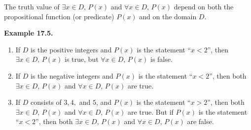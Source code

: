 \documentclass[aspectratio=169]{beamer}
\begin{document}

\begin{frame}[plain]{ }
  
 
  The truth value of $\exists x\in D,\, P(x)$ and $\forall x\in D,\, P(x)$ depend on both
the propositional function (or predicate) $P(x)$ and on the domain $D$. \pause 
    \medskip
    
    {\bf Example 17.5.}
      \begin{enumerate}[<+->]
       \item If $D$ is the positive integers and $P(x)$ is the statement
	  ``$x < 2$'', then $\exists x\in D,\, P(x)$ is true, but $\forall x\in D,\, P(x)$ is false.
	\item  If $D$ is the negative integers and $P(x)$ is the statement
	    ``$x < 2$'', then both $\exists x\in D,\, P(x)$ and $\forall x\in D,\, P(x)$ 
	    are true.
	\item If $D$ consists of $3, 4,$ and $5$, and $P(x)$ is the statement
            ``$x> 2$'', then  both $\exists x\in D,\, P(x)$ and $\forall x\in D,\, P(x)$
             are true. But if
            $P(x)$ is the statement ``$x < 2$'', then both $\exists x\in D,\, P(x)$ and $\forall x\in D,\, P(x)$
            are false.
      \end{enumerate}


\end{frame}
\end{document}

